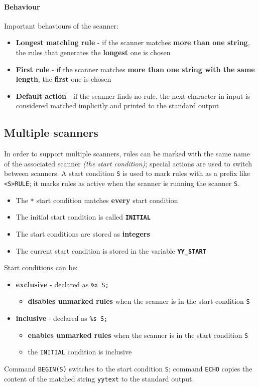 \paragraph*{Behaviour}
Important behaviours of the scanner:
\begin{itemize}
  \item \textbf{Longest matching rule} - if the scanner matches \textbf{more than one string}, the rules that generates the \textbf{longest} one is chosen
  \item \textbf{First rule} - if the scanner matches\textbf{ more than one string with the same length}, the \textbf{first} one is chosen
  \item \textbf{Default action} - if the scanner finds no rule, the next character in input is considered matched implicitly and printed to the standard output
\end{itemize}

\subsection{Multiple scanners}
In order to support multiple scanners, rules can be marked with the same name of the associated scanner \textit{(the start condition)};
special actions are used to switch between scanners.
A start condition \texttt{S} is used to mark rules with as a prefix like \texttt{<S>RULE};
it marks rules as active when the scanner is running the scanner \texttt{S}.
\begin{itemize}
  \item The \texttt{*} start condition matches \textbf{every} start condition
  \item The initial start condition is called \textbf{\texttt{INITIAL}}
  \item The start conditions are stored as \textbf{integers}
  \item The current start condition is stored in the variable \textbf{\texttt{YY\_START}}
\end{itemize}
Start conditions can be:
\begin{itemize}[label=\textbf{\texttt{>}}]
  \item \textbf{exclusive} - declared as \texttt{\%x S;}
        \begin{itemize}
          \item \textbf{disables unmarked rules} when the scanner is in the start condition \texttt{S}
        \end{itemize}
  \item \textbf{inclusive} - declared as \texttt{\%s S;}
        \begin{itemize}
          \item \textbf{enables unmarked rules} when the scanner is in the start condition \texttt{S}
          \item the \texttt{INITIAL} condition is inclusive
        \end{itemize}
\end{itemize}

Command \texttt{BEGIN(S)} switches to the start condition \texttt{S};
command \texttt{ECHO} copies the content of the matched string \texttt{yytext} to the standard output.